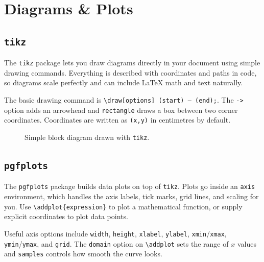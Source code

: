 \section{Diagrams \& Plots}

\subsection{\texttt{tikz}}
The \texttt{tikz} package lets you draw diagrams directly in your document using simple drawing commands. Everything is described with coordinates and paths in code, so diagrams scale perfectly and can include \LaTeX{} math and text naturally.

The basic drawing command is \texttt{\textbackslash draw[options] (start) -- (end);}. The \texttt{->} option adds an arrowhead and \texttt{rectangle} draws a box between two corner coordinates. Coordinates are written as \texttt{(x,y)} in centimetres by default.

\begin{figure}[H]
	\centering
	\caption{Simple block diagram drawn with \texttt{tikz}.}
	\label{fig:tikz}
\end{figure}

\subsection{\texttt{pgfplots}}
The \texttt{pgfplots} package builds data plots on top of \texttt{tikz}. Plots go inside an \texttt{axis} environment, which handles the axis labels, tick marks, grid lines, and scaling for you. Use \texttt{\textbackslash addplot\{expression\}} to plot a mathematical function, or supply explicit coordinates to plot data points.

Useful axis options include \texttt{width}, \texttt{height}, \texttt{xlabel}, \texttt{ylabel}, \texttt{xmin}/\texttt{xmax}, \texttt{ymin}/\texttt{ymax}, and \texttt{grid}. The \texttt{domain} option on \texttt{\textbackslash addplot} sets the range of $x$ values and \texttt{samples} controls how smooth the curve looks.

